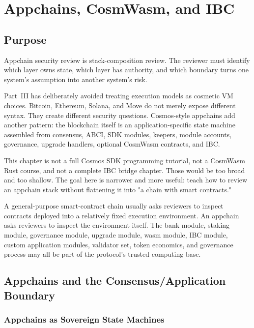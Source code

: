 \chapter{Appchains, CosmWasm, and IBC}

\section{Purpose}

\begin{principlebox}
Appchain security review is stack-composition review. The reviewer must identify which layer owns state, which layer has authority, and which boundary turns one system's assumption into another system's risk.
\end{principlebox}

Part~III has deliberately avoided treating execution models as cosmetic VM choices. Bitcoin, Ethereum, Solana, and Move do not merely expose different syntax. They create different security questions. Cosmos-style appchains add another pattern: the blockchain itself is an application-specific state machine assembled from consensus, ABCI, SDK modules, keepers, module accounts, governance, upgrade handlers, optional CosmWasm contracts, and IBC.

This chapter is not a full Cosmos SDK programming tutorial, not a CosmWasm Rust course, and not a complete IBC bridge chapter. Those would be too broad and too shallow. The goal here is narrower and more useful: teach how to review an appchain stack without flattening it into "a chain with smart contracts."

A general-purpose smart-contract chain usually asks reviewers to inspect contracts deployed into a relatively fixed execution environment. An appchain asks reviewers to inspect the environment itself. The bank module, staking module, governance module, upgrade module, wasm module, IBC module, custom application modules, validator set, token economics, and governance process may all be part of the protocol's trusted computing base.

\section{Appchains and the Consensus/Application Boundary}

\subsection{Appchains as Sovereign State Machines}

